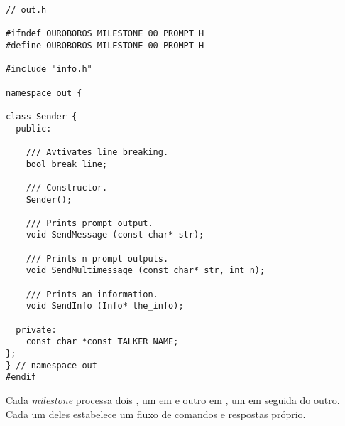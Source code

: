\vspace{1em}
\begin{lstlisting}
// out.h

#ifndef OUROBOROS_MILESTONE_00_PROMPT_H_
#define OUROBOROS_MILESTONE_00_PROMPT_H_

#include "info.h"

namespace out {

class Sender {
  public:

    /// Avtivates line breaking.
    bool break_line;

    /// Constructor.
    Sender();
    
    /// Prints prompt output.
    void SendMessage (const char* str);
    
    /// Prints n prompt outputs.
    void SendMultimessage (const char* str, int n);

    /// Prints an information.
    void SendInfo (Info* the_info);

  private:
    const char *const TALKER_NAME;
};
} // namespace out
#endif
\end{lstlisting}

Cada \textit{milestone} processa dois , um em
 e outro em , um em seguida do outro.
Cada um deles estabelece um fluxo de comandos e respostas
próprio.

